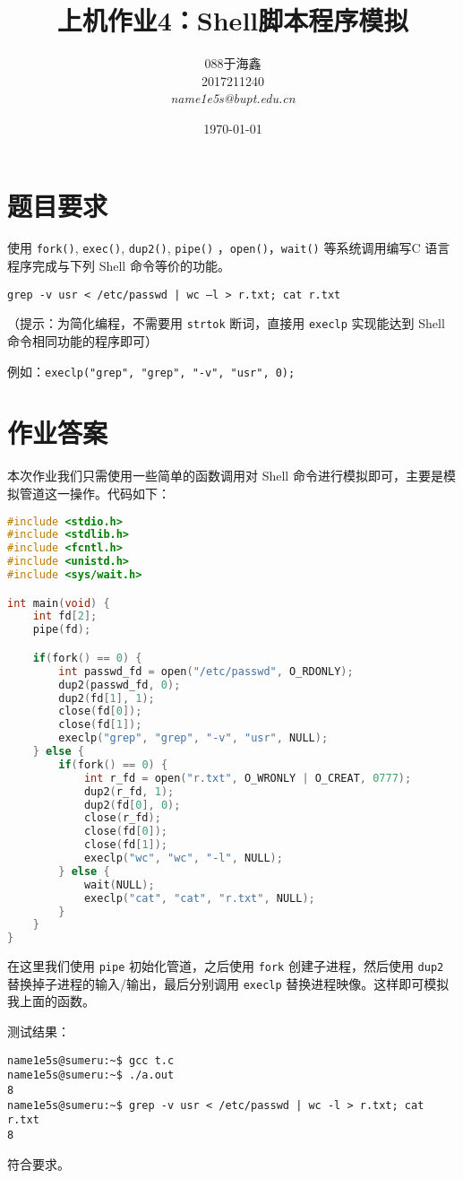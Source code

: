 \documentclass[blue,normal,cn]{elegantnote}
\title{上机作业4：Shell脚本程序模拟}
\date{\today}
\newcommand{\code}[1]{\colorbox{light-gray}{\texttt{#1}}}
\begin{document}
\author{
    \begin{tabular}[t]{c}
        088于海鑫  \\
        2017211240 \\
        \emph{name1e5s@bupt.edu.cn}
    \end{tabular}
}
\maketitle

\section{题目要求}

使用 \code{fork()}, \code{exec()}, \code{dup2()}, \code{pipe()} ，\code{open()}，\code{wait()} 等系统调用编写C 语言程序完成与下列 Shell 命令等价的功能。

\begin{lstlisting}
grep -v usr < /etc/passwd | wc –l > r.txt; cat r.txt
\end{lstlisting}

（提示：为简化编程，不需要用 \code{strtok} 断词，直接用 \code{execlp} 实现能达到 Shell 命令相同功能的程序即可）

例如：\code{execlp("grep", "grep", "-v", "usr", 0);}

\section{作业答案}

本次作业我们只需使用一些简单的函数调用对 Shell 命令进行模拟即可，主要是模拟管道这一操作。代码如下：

\begin{lstlisting}[language=C]
#include <stdio.h>
#include <stdlib.h>
#include <fcntl.h>
#include <unistd.h>
#include <sys/wait.h>

int main(void) {
    int fd[2];
    pipe(fd);

    if(fork() == 0) {
        int passwd_fd = open("/etc/passwd", O_RDONLY);
        dup2(passwd_fd, 0);
        dup2(fd[1], 1);
        close(fd[0]);
        close(fd[1]);
        execlp("grep", "grep", "-v", "usr", NULL);
    } else {
        if(fork() == 0) {
            int r_fd = open("r.txt", O_WRONLY | O_CREAT, 0777);
            dup2(r_fd, 1);
            dup2(fd[0], 0);
            close(r_fd);
            close(fd[0]);
            close(fd[1]);
            execlp("wc", "wc", "-l", NULL);
        } else {
            wait(NULL);
            execlp("cat", "cat", "r.txt", NULL);
        }
    }
}
\end{lstlisting}

在这里我们使用 \code{pipe} 初始化管道，之后使用 \code{fork} 创建子进程，然后使用 \code{dup2} 替换掉子进程的输入/输出，最后分别调用 \code{execlp} 替换进程映像。这样即可模拟我上面的函数。

测试结果：

\begin{lstlisting}
name1e5s@sumeru:~$ gcc t.c
name1e5s@sumeru:~$ ./a.out
8
name1e5s@sumeru:~$ grep -v usr < /etc/passwd | wc -l > r.txt; cat r.txt
8
\end{lstlisting}

符合要求。
\end{document}
